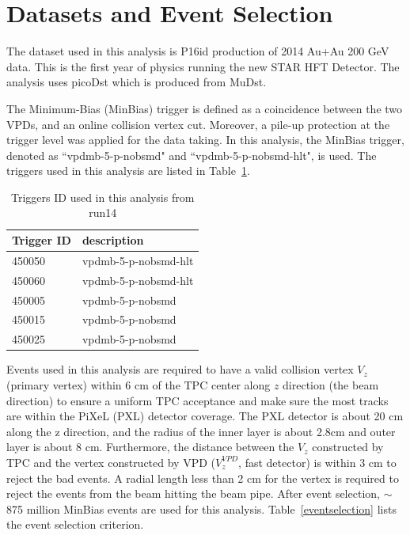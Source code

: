 \clearpage

\section{\label{dataset}Datasets and Event Selection}

The dataset used in this analysis is P16id production of 2014 Au+Au 200 GeV data. This is the first year of physics running the new STAR HFT Detector. The analysis uses picoDst which is produced from MuDst.

The Minimum-Bias (MinBias) trigger is defined as a coincidence between the two VPDs, and an online collision vertex cut. Moreover, a pile-up protection at the trigger level was applied for the data taking. In this analysis, the MinBias trigger, denoted as ``vpdmb-5-p-nobsmd" and ``vpdmb-5-p-nobsmd-hlt", is used. The triggers used in this analysis are listed in Table~\ref{trigger}.

\begin{table}[htp]
\centering
\caption{Triggers ID used in this analysis from run14}
\label{trigger}
	\begin{center}
	\begin{tabular}{l|l}
	Trigger ID	& description\\ \hline
	450050		& vpdmb-5-p-nobsmd-hlt\\ \hline
	450060		& vpdmb-5-p-nobsmd-hlt\\ \hline
	450005		& vpdmb-5-p-nobsmd\\ \hline
	450015		& vpdmb-5-p-nobsmd\\ \hline
	450025		& vpdmb-5-p-nobsmd\\ \hline
	\end{tabular}
	\end{center}
\end{table}

Events used in this analysis are required to have a valid collision vertex $V_{z}$ (primary vertex) within 6 cm of the TPC center along $z$ direction (the beam direction) to ensure a uniform TPC acceptance and make sure the most tracks are within the PiXeL (PXL) detector coverage. The PXL detector is about 20 cm along the z direction, and the radius of the inner layer is about 2.8cm and outer layer is about 8 cm. Furthermore, the distance between the $V_{z}$ constructed by TPC and the vertex constructed by VPD ($V_{z}^{VPD}$, fast detector) is within 3 cm to reject the bad events. A radial length less than 2 cm for the vertex is required to reject the events from the beam hitting the beam pipe. After event selection, $\sim$875 million MinBias events are used for this analysis. Table~\ref{eventselection} lists the event selection criterion.

